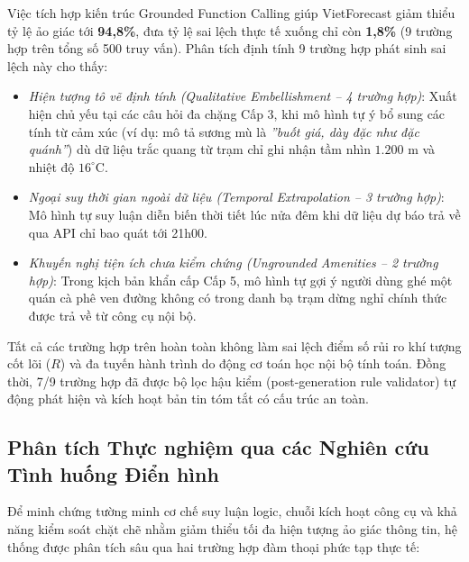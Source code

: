 Việc tích hợp kiến trúc Grounded Function Calling giúp VietForecast giảm thiểu tỷ lệ ảo giác tới \textbf{94,8\%}, đưa tỷ lệ sai lệch thực tế xuống chỉ còn \textbf{1,8\%} (9 trường hợp trên tổng số 500 truy vấn). Phân tích định tính 9 trường hợp phát sinh sai lệch này cho thấy:
\begin{itemize}
    \item[-] \textit{Hiện tượng tô vẽ định tính (Qualitative Embellishment -- 4 trường hợp)}: Xuất hiện chủ yếu tại các câu hỏi đa chặng Cấp 3, khi mô hình tự ý bổ sung các tính từ cảm xúc (ví dụ: mô tả sương mù là \textit{”buốt giá, dày đặc như đặc quánh”}) dù dữ liệu trắc quang từ trạm chỉ ghi nhận tầm nhìn $1.200\text{ m}$ và nhiệt độ $16^\circ\text{C}$.
    \item[-] \textit{Ngoại suy thời gian ngoài dữ liệu (Temporal Extrapolation -- 3 trường hợp)}: Mô hình tự suy luận diễn biến thời tiết lúc nửa đêm khi dữ liệu dự báo trả về qua API chỉ bao quát tới 21h00.
    \item[-] \textit{Khuyến nghị tiện ích chưa kiểm chứng (Ungrounded Amenities -- 2 trường hợp)}: Trong kịch bản khẩn cấp Cấp 5, mô hình tự gợi ý người dùng ghé một quán cà phê ven đường không có trong danh bạ trạm dừng nghỉ chính thức được trả về từ công cụ nội bộ.
\end{itemize}
Tất cả các trường hợp trên hoàn toàn không làm sai lệch điểm số rủi ro khí tượng cốt lõi ($R$) và đa tuyến hành trình do động cơ toán học nội bộ tính toán. Đồng thời, 7/9 trường hợp đã được bộ lọc hậu kiểm (post-generation rule validator) tự động phát hiện và kích hoạt bản tin tóm tắt có cấu trúc an toàn.

\subsection{Phân tích Thực nghiệm qua các Nghiên cứu Tình huống Điển hình}
Để minh chứng tường minh cơ chế suy luận logic, chuỗi kích hoạt công cụ và khả năng kiểm soát chặt chẽ nhằm giảm thiểu tối đa hiện tượng ảo giác thông tin, hệ thống được phân tích sâu qua hai trường hợp đàm thoại phức tạp thực tế:

